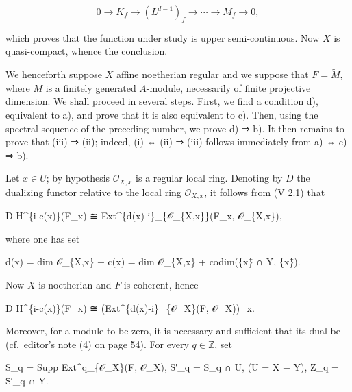 \documentclass[
  11pt,
  a4paper,
]{book}
\newenvironment{Shaded}{}{}
\newcommand{\NormalTok}[1]{#1}
\begin{document}
\[ 0 \to K_{f} \to (L^{d-1})_{f} \to \cdots \to M_{f} \to 0, \]

which proves that the function under study is upper semi-continuous. Now
\(X\) is quasi-compact, whence the conclusion.

We henceforth suppose \(X\) affine noetherian regular and we suppose
that \(F = \tilde{M}\), where \(M\) is a finitely generated
\(A\)-module, necessarily of finite projective dimension. We shall
proceed in several steps. First, we find a condition d), equivalent to
a), and prove that it is also equivalent to c). Then, using the spectral
sequence of the preceding number, we prove d) ⇒ b). It then remains to
prove that (iii) ⇒ (ii); indeed, (i) ⇔ (ii) ⇒ (iii) follows immediately
from a) ⇔ c) ⇒ b).

Let \(x \in U\); by hypothesis \(\mathcal{O}_{X,x}\) is a regular local
ring. Denoting by \(D\) the dualizing functor relative to the local ring
\(\mathcal{O}_{X,x}\), it follows from (V 2.1) that

\begin{Shaded}
\begin{Highlighting}[]
\NormalTok{D H\^{}\{i{-}c(x)\}(F\_x) ≅ Ext\^{}\{d(x){-}i\}\_\{𝒪\_\{X,x\}\}(F\_x, 𝒪\_\{X,x\}),}
\end{Highlighting}
\end{Shaded}

where one has set

\begin{Shaded}
\begin{Highlighting}[]
\NormalTok{d(x) = dim 𝒪\_\{X,x\} + c(x) = dim 𝒪\_\{X,x\} + codim(\{x\}̄ ∩ Y, \{x\}̄).}
\end{Highlighting}
\end{Shaded}

Now \(X\) is noetherian and \(F\) is coherent, hence

\begin{Shaded}
\begin{Highlighting}[]
\NormalTok{D H\^{}\{i{-}c(x)\}(F\_x) ≅ (Ext\^{}\{d(x){-}i\}\_\{𝒪\_X\}(F, 𝒪\_X))\_x.}
\end{Highlighting}
\end{Shaded}

Moreover, for a module to be zero, it is necessary and sufficient that
its dual be (cf.~editor's note (4) on page 54). For every
\(q \in \mathbb{Z}\), set

\begin{Shaded}
\begin{Highlighting}[]
\NormalTok{S\_q = Supp Ext\^{}q\_\{𝒪\_X\}(F, 𝒪\_X),}
\NormalTok{S′\_q = S\_q ∩ U,    (U = X − Y),}
\NormalTok{Z\_q = S̄′\_q ∩ Y.}
\end{Highlighting}
\end{Shaded}
\end{document}

